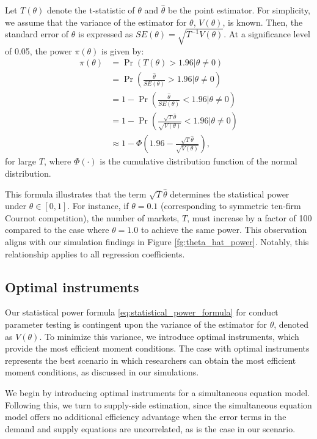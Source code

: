 \documentclass[11pt, a4paper]{article}
\begin{document}
Let $T(\theta)$ denote the t-statistic of $\theta$ and $\hat{\theta}$ be the point estimator. For simplicity, we assume that the variance of the estimator for $\theta$, $V(\theta)$, is known. Then, the standard error of $\theta$ is expressed as $SE(\theta) = \sqrt{T^{-1}V(\theta)}$. 
At a significance level of 0.05, the power $\pi(\theta)$ is given by:
\begin{align}
    \pi(\theta) &= \Pr(T(\theta)>1.96|\theta\neq 0)\nonumber\\
    &=\Pr\left(\frac{\hat{\theta}}{SE(\theta)}>1.96|\theta\neq 0\right)\nonumber\\
    &=1 - \Pr\left(\frac{\hat{\theta}}{SE(\theta)}<1.96|\theta\neq 0\right)\nonumber\\
    &=1 - \Pr\left(\frac{\sqrt{T}\hat{\theta}}{\sqrt{V(\theta)}}<1.96|\theta\neq 0\right)\nonumber\\
    &\approx 1 - \Phi\left(1.96 - \frac{\sqrt{T}\hat{\theta}}{\sqrt{V(\theta)}}\right),\label{eq:statistical_power_formula}
\end{align}
for large $T$, where $\Phi(\cdot)$ is the cumulative distribution function of the normal distribution.

This formula illustrates that the term $\sqrt{T}\hat{\theta}$ determines the statistical power under $\theta \in [0,1]$. For instance, if $\theta = 0.1$ (corresponding to symmetric ten-firm Cournot competition), the number of markets, $T$, must increase by a factor of 100 compared to the case where $\theta = 1.0$ to achieve the same power. This observation aligns with our simulation findings in Figure \ref{fg:theta_hat_power}. Notably, this relationship applies to all regression coefficients.

\subsection{Optimal instruments}\label{sec:optimal_instruments}

Our statistical power formula \eqref{eq:statistical_power_formula} for conduct parameter testing is contingent upon the variance of the estimator for $\theta$, denoted as $V(\theta)$. To minimize this variance, we introduce optimal instruments, which provide the most efficient moment conditions. The case with optimal instruments represents the best scenario in which researchers can obtain the most efficient moment conditions, as discussed in our simulations. 

We begin by introducing optimal instruments for a simultaneous equation model. Following this, we turn to supply-side estimation, since the simultaneous equation model offers no additional efficiency advantage when the error terms in the demand and supply equations are uncorrelated, as is the case in our scenario.
\end{document}
